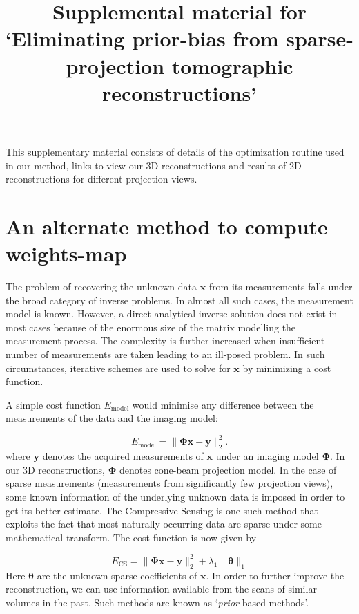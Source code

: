 \documentclass{article}
\title{Supplemental material for `Eliminating prior-bias from sparse-projection
tomographic reconstructions'}
\begin{document}
\maketitle
This supplementary material consists of details of the optimization routine used in our method, links to view our 3D reconstructions and results of 2D reconstructions for different projection views.

\tableofcontents
\newpage
\section{An alternate method to compute weights-map}
The problem of recovering the unknown data $\boldsymbol{x}$ from its measurements falls under the broad category of inverse problems. In almost all such cases, the measurement model is known. However, a direct analytical inverse solution does not exist in most cases because of the enormous size of the matrix modelling the measurement process. The complexity is further increased when insufficient number of measurements are taken leading to an ill-posed problem. In such circumstances, iterative schemes are used to solve for $\boldsymbol{x}$ by minimizing a cost function. 

A simple cost function $E_\text{model}$ would minimise any difference between the measurements of the data and the imaging model:

\begin{equation}
E_\text{model} = \lVert\boldsymbol{\Phi x- y}\rVert_2^2.
\end{equation}
where $\boldsymbol{y}$ denotes the acquired measurements of $\boldsymbol{x}$ under an imaging model $\boldsymbol{\Phi}$. In our 3D reconstructions, $\boldsymbol{\Phi}$ denotes cone-beam projection model. In the case of sparse measurements (measurements from significantly few projection views), some known information of the underlying unknown data is imposed in order to get its better estimate. The Compressive Sensing is one such method that exploits the fact that most naturally occurring data are sparse under some mathematical transform. The cost function is now given by

\begin{equation}
E_\text{CS} = \lVert\boldsymbol{\Phi x- y}\rVert_2^2  + \lambda_1\lVert\boldsymbol{\theta}\rVert_1
\end{equation}
Here $\boldsymbol{\theta}$ are the unknown sparse coefficients of $\boldsymbol{x}$. In order to further improve the reconstruction, we can use information available from the scans of similar volumes in the past. Such methods are known as `\emph{prior}-based methods'. 
\end{document}
